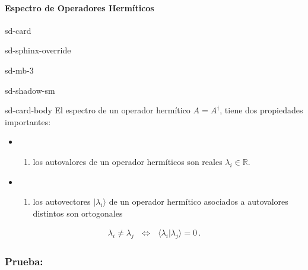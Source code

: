 \documentclass[letterpaper,10pt,english]{jupyterBook}
\newcommand{\ket}[1]{|#1\rangle}
\newcommand{\braket}[2]{\langle #1|#2\rangle}
\begin{document}
\paragraph{Espectro de Operadores Hermíticos}
\label{\detokenize{docs/Part_01_Formalismo/Chapter_01_02_Formalismo_matem_xe1tico/01_03_Operadores_myst:espectro-de-operadores-hermiticos}}
\begin{sphinxuseclass}{sd-card}
\begin{sphinxuseclass}{sd-sphinx-override}
\begin{sphinxuseclass}{sd-mb-3}
\begin{sphinxuseclass}{sd-shadow-sm}
\begin{sphinxuseclass}{sd-card-body}
\sphinxAtStartPar
El espectro de un operador hermítico  \(A = A^\dagger\),  tiene dos propiedades importantes:
\begin{itemize}
\item {} \begin{enumerate}
%
\item {} 
\sphinxAtStartPar
los autovalores de un operador hermíticos son reales \(\lambda_i \in {\mathbb R}\).

\end{enumerate}

\item {} \begin{enumerate}
%
\setcounter{enumi}{1}
\item {} 
\sphinxAtStartPar
los autovectores \(\ket{\lambda_i}\) de un operador hermítico asociados a autovalores distintos son ortogonales

\end{enumerate}

\end{itemize}
\begin{equation*}
\begin{split}
\lambda_i\neq \lambda_j ~~~\Longleftrightarrow ~~~\braket{\lambda_i}{\lambda_j} = 0\, .
\end{split}
\end{equation*}
\end{sphinxuseclass}
\end{sphinxuseclass}
\end{sphinxuseclass}
\end{sphinxuseclass}
\end{sphinxuseclass}\subsubsection*{Prueba:}
\end{document}
